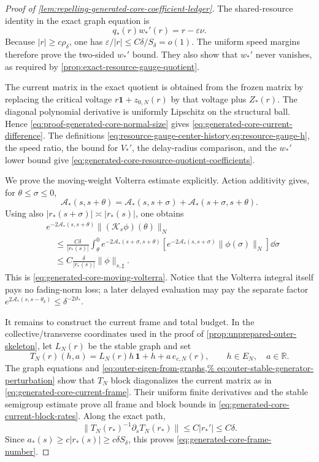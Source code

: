 \begin{proof}[Proof of
\cref{lem:repelling-generated-core-coefficient-ledger}]
The shared-resource identity in the exact graph equation is
\begin{equation}
 q_*(r)w_*'(r)=r-\varepsilon\nu.                \label{eq:proof-generated-core-resource-identity}
\end{equation}
Because \(|r|\ge c\rho_\delta\), one has
\(\varepsilon/|r|\le C\delta/S_\delta=o(1)\).
The uniform speed margins therefore prove the two-sided \(w_*'\) bound.
They also show that \(w_*'\) never vanishes, as required by
\cref{prop:exact-resource-gauge-quotient}.

The current matrix in the exact quotient is obtained from the frozen
matrix by replacing the critical voltage
\(r\mathbf1+z_{0,N}(r)\) by that voltage plus \(Z_*(r)\).
The diagonal polynomial derivative is uniformly Lipschitz on the
structural ball.  Hence
\cref{eq:proof-generated-core-normal-size} gives
\cref{eq:generated-core-current-difference}.  The definitions
\cref{eq:resource-gauge-center-history,eq:resource-gauge-h}, the speed
ratio, the bound for \(V_*'\), the delay-radius comparison, and the
\(w_*'\) lower bound give
\cref{eq:generated-core-resource-quotient-coefficients}.

We prove the moving-weight Volterra estimate explicitly.  Action
additivity gives, for \(\theta\le\sigma\le0\),
\[
 \mathscr A_*(s,s+\theta)
 =\mathscr A_*(s,s+\sigma)
   +\mathscr A_*(s+\sigma,s+\theta).
\]
Using also \(|r_*(s+\sigma)|\asymp|r_*(s)|\), one obtains
\begin{align*}
 &e^{-2\mathscr A_*(s,s+\theta)}
   \|(\mathcal K_s\phi)(\theta)\|_N\\
 &\quad\le
 \frac{C\delta}{|r_*(s)|}
 \int_\theta^0
 e^{-2\mathscr A_*(s+\sigma,s+\theta)}
 \left[
 e^{-2\mathscr A_*(s,s+\sigma)}
       \|\phi(\sigma)\|_N\right]\dd\sigma\\
 &\quad\le
 C\frac{\delta}{|r_*(s)|}\|\phi\|_{s,\sharp}.
\end{align*}
This is \cref{eq:generated-core-moving-volterra}.  Notice that the
Volterra integral itself pays no fading-norm loss; a later delayed
evaluation may pay the separate factor
\(e^{2\mathscr A_*(s,s-\theta_k)}
\le\delta^{-2\vartheta_*}\).

It remains to construct the current frame and total budget.  In the
collective/transverse coordinates used in the proof of
\cref{prop:unprepared-outer-skeleton}, let \(L_N(r)\) be the stable graph
and set
\[
 T_N(r)(h,a)
 =L_N(r)h\,\mathbf1+h+a\,e_{c,N}(r),
 \qquad h\in E_N,\quad a\in\mathbb R.
\]
The graph equations and
\cref{eq:outer-eigen-from-graphs,%
eq:outer-stable-generator-perturbation}
show that \(T_N\) block diagonalizes the current matrix as in
\cref{eq:generated-core-current-frame}.  Their uniform finite
derivatives and the stable semigroup estimate prove all frame and block
bounds in
\cref{eq:generated-core-current-block-rates}.  Along the exact path,
\[
 \|T_N(r_*)^{-1}\partial_sT_N(r_*)\|
 \le C|r_*'|\le C\delta.
\]
Since \(a_*(s)\ge c|r_*(s)|\ge c\delta S_\delta\), this proves
\cref{eq:generated-core-frame-number}.


\end{proof}
